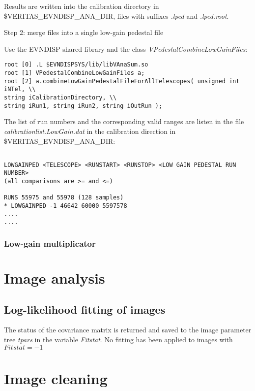 \documentclass[titlepage,a4paper,twoside,11pt]{report}
\begin{document}
Results are written into the calibration directory in \$VERITAS\_EVNDISP\_ANA\_DIR, 
files with suffixes {\it.lped} and {\it .lped.root}.

Step 2: merge files into a single low-gain pedestal file

Use the EVNDISP shared library and the class {\it VPedestalCombineLowGainFiles}:

\begin{lstlisting}
root [0] .L $EVNDISPSYS/lib/libVAnaSum.so
root [1] VPedestalCombineLowGainFiles a;
root [2] a.combineLowGainPedestalFileForAllTelescopes( unsigned int iNTel, \\
string iCalibrationDirectory, \\
string iRun1, string iRun2, string iOutRun );
\end{lstlisting}

The list of run numbers and the corresponding valid ranges are listen in the file
{\it calibrationlist.LowGain.dat} in the calibration direction in \$VERITAS\_EVNDISP\_ANA\_DIR:

\begin{lstlisting}

LOWGAINPED <TELESCOPE> <RUNSTART> <RUNSTOP> <LOW GAIN PEDESTAL RUN NUMBER>
(all comparisons are >= and <=)

RUNS 55975 and 55978 (128 samples)
* LOWGAINPED -1 46642 60000 5597578 
....
....

\end{lstlisting}

\subsubsection{Low-gain multiplicator}

\section{Image analysis}

\subsection{Log-likelihood fitting of images}

The status of the covariance matrix is returned and saved to the image parameter tree {\it tpars} in the variable {\it Fitstat}. 
No fitting has been applied to images with $Fitstat=-1$ 

\section{Image cleaning}
\end{document}
